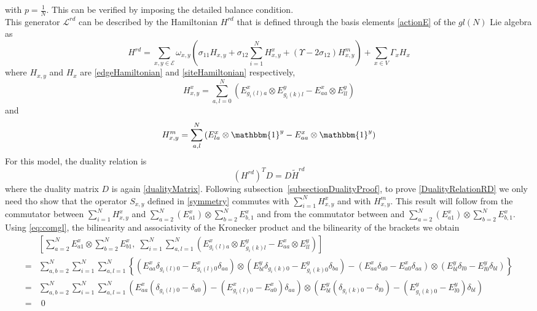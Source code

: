 \documentclass[11pt]{article}
\numberwithin{equation}{section}
\numberwithin{equation}{subsection}
\begin{document}
with $p=\frac{1}{N}$. This can be verified by imposing the detailed balance condition.\\
This generator $\mathcal{L}^{rd}$ can be described by the Hamiltonian $H^{rd}$ that is defined through the basis elements \eqref{actionE} of the $gl(N)$ Lie algebra as 
\begin{equation}
    H^{rd}=\sum_{x,y\in \mathcal{E}}\omega_{x,y}\left(\sigma_{11}H_{x,y}+\sigma_{12}\sum_{i=1}^{N}H_{x,y}^{x}+(\Upsilon-2\sigma_{12})H_{x,y}^{m}\right)+\sum_{x\in V}\Gamma_{x}H_{x}
\end{equation}
where $H_{x,y}$ and $H_{x}$ are \eqref{edgeHamiltonian} and \eqref{siteHamiltonian} respectively, 
\begin{equation}
    H_{x,y}^{x}=\sum_{a,l=0}^{N}\left(E_{g_{i}(l)a}^{x}\otimes E_{g_{i}(k)l}^{y}-E_{aa}^{x}\otimes E_{ll}^{y}\right)
\end{equation}
and 
\begin{equation}
    H_{x,y}^{m}=\sum_{a,l}^{N}\left(E_{la}^{x}\otimes \mathbbm{1}^{y}-E_{aa}^{x}\otimes \mathbbm{1}^{y}\right)
\end{equation}
For this model, the duality relation is
\begin{equation}\label{DualityRelationRD}
    (H^{rd})^{T}D=D\widetilde{H}^{rd}
\end{equation}
where the duality matrix $D$ is again \eqref{dualityMatrix}. Following subsection~\ref{subsectionDualityProof}, to prove \eqref{DualityRelationRD} we only need tho show that the operator $S_{x,y}$ defined in \eqref{symmetry} commutes with $\sum_{i=1}^{N}H_{x,y}^{x}$ and with $H_{x,y}^{m}$. This result will follow from the commutator between $\sum_{i=1}^{N}H_{x,y}^{x}$ and $\sum_{a=2}^{N}(E_{a1}^{x})\otimes \sum_{b=2}^{N}E_{b,1}^{x}$ and from the commutator between  and $\sum_{a=2}^{N}(E_{a1}^{x})\otimes \sum_{b=2}^{N}E_{b,1}^{x}$. Using \eqref{eq:comgl}, the bilinearity and associativity of the Kronecker product and the bilinearity of the brackets we obtain 
\begin{align*}
    &\left[\sum_{a=2}^{N}E_{a1}^{x}\otimes \sum_{b=2}^{N}E_{b1}^{x},\;\sum_{i=1}^{N}\sum_{a,l=1}^{N}\left(E_{g_{i}(l)a}^{x}\otimes E_{g_{i}(k)l}^{y}-E_{aa}^{x}\otimes E_{ll}^{y}\right)\right]
    \\=&\sum_{a,b=2}^{N}\sum_{i=1}^{N}\sum_{a,l=1}^{N}\left\{\left(E_{aa}^{x}\delta_{g_{i}(l)0}-E_{g_{i}(l)0}^{x}\delta_{aa}\right)\otimes \left(E_{bl}^{y}\delta_{g_{i}(k)0}-E_{g_{i}(k)0}^{y}\delta_{ba}\right)-\left(E_{aa}^{x}\delta_{a0}-E_{a0}^{x}\delta_{aa}\right)\otimes \left(E_{bl}^{y}\delta_{l0}-E_{l0}^{y}\delta_{bl}\right)\right\}
    \\=&
    \sum_{a,b=2}^{N}\sum_{i=1}^{N}\sum_{a,l=1}^{N}\left(E_{aa}^{x}\left(\delta_{g_{i}(l)0}-\delta_{a0}\right)-\left(E_{g_{i}(l)0}^{x}-E_{a0}^{x}\right)\delta_{aa}\right)\otimes \left(E_{bl}^{y}\left(\delta_{g_{i}(k)0}-\delta_{l0}\right)-\left(E_{g_{i}(k)0}^{y}-E_{l0}^{y}\right)\delta_{bl}\right)
    \\=&\;0
\end{align*}
\end{document}

